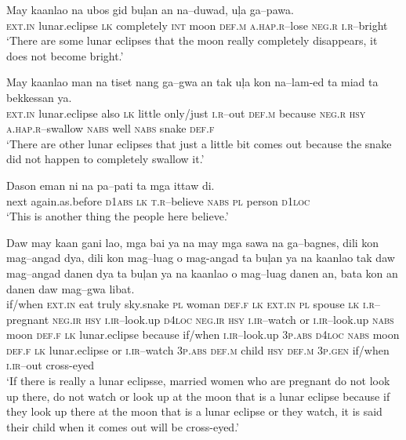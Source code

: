 \ea
\gll May  kaanlao  na  ubos  gid  bu\c{l}an  an  na--duwad,   u\c{l}a  ga--pawa. \\
\textsc{ext.in}  lunar.eclipse  \textsc{lk}  completely  \textsc{int}  moon  \textsc{def.m}  \textsc{a.hap.r}--lose 
\textsc{neg.r}  \textsc{i.r--}bright \\
\glt ‘There are some lunar eclipses that the moon really completely disappears, it does not become bright.’
\z

\ea
\gll  May  kaanlao  man  na  tiset  nang  ga--gwa  an  tak  u\c{l}a   kon  na--lam-ed  ta  miad  ta  bekkessan  ya. \\
\textsc{ext.in}  lunar.eclipse  also  \textsc{lk}  little  only/just  \textsc{i.r}--out  \textsc{def.m}  because  \textsc{neg.r}
\textsc{hsy}  \textsc{a.hap.r}--swallow  \textsc{nabs}  well  \textsc{nabs}  snake  \textsc{def.f} \\
\glt ‘There are other lunar eclipses that just a little bit comes out because the snake did not happen to completely swallow it.’
\z

\ea
\gll  Dason  eman  ni  na  pa--pati  ta  mga  ittaw  di. \\
next  again.as.before  \textsc{d1abs}  \textsc{lk}  \textsc{t.r}--believe  \textsc{nabs}  \textsc{pl}  person  \textsc{d1loc} \\
\glt ‘This is another thing the people here believe.’
\z

\ea
\gll Daw  may  kaan  gani  lao,  mga  bai  ya  na  may   mga  sawa  na  ga--bagnes,  dili  kon  mag--angad  dya,  dili   kon  mag--luag  o  mag-angad  ta    bu\c{l}an  ya  na  kaanlao tak  daw  mag--angad  danen  dya  ta  bu\c{l}an  ya  na  kaanlao o  mag--luag  danen  an,  bata  kon  an  danen  daw mag--gwa  libat. \\
if/when  \textsc{ext.in}  eat  truly  sky.snake  \textsc{pl}  woman  \textsc{def.f}  \textsc{lk}  \textsc{ext.in}
\textsc{pl}  spouse  \textsc{lk}  \textsc{i.r}--pregnant  \textsc{neg.ir}  \textsc{hsy}  \textsc{i.ir}--look.up  \textsc{d4loc}  \textsc{neg.ir}
\textsc{hsy}  \textsc{i.ir}--watch  or  \textsc{i.ir}--look.up  \textsc{nabs}  moon  \textsc{def.f}  \textsc{lk}  lunar.eclipse 
because  if/when  \textsc{i.ir}--look.up  3\textsc{p.abs}  \textsc{d4loc}  \textsc{nabs}  moon  \textsc{def.f}  \textsc{lk}  lunar.eclipse
or  \textsc{i.ir}--watch  3\textsc{p.abs}  \textsc{def.m}  child  \textsc{hsy}  \textsc{def.m}  3\textsc{p.gen}  if/when
 \textsc{i.ir}--out  cross-eyed \\
\glt ‘If there is really a lunar eclipsse, married women who are pregnant do not look up there, do not watch or look up at the moon that is a lunar eclipse because if they look up there at the moon that is a lunar eclipse or they watch, it is said their child when it comes out will be cross-eyed.’
\z

